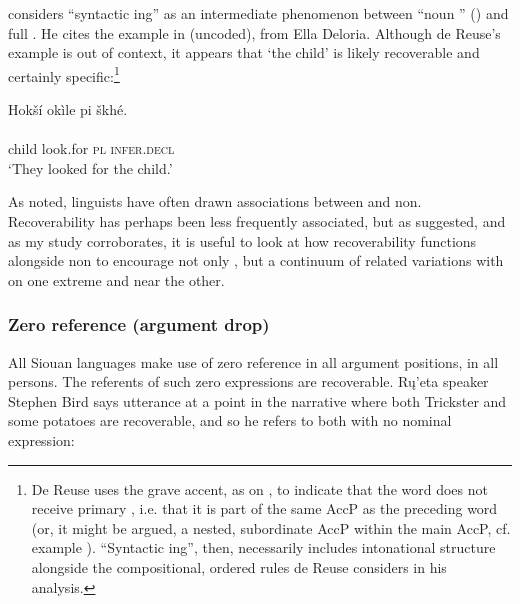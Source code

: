 \documentclass[output=paper]{LSP/langsci}
\begin{document}
 considers “syntactic ing” as an intermediate phenomenon between “noun ” () and full . He cites the example in  (uncoded), from Ella Deloria. Although de Reuse’s example is out of context, it appears that `the child' is likely recoverable and certainly specific:\footnote{De Reuse uses the grave accent, as on , to indicate that the word does not receive primary , i.e. that it is part of the same AccP as the preceding word (or, it might be argued, a nested, subordinate AccP within the main AccP, cf. example ). “Syntactic ing”, then, necessarily includes intonational structure alongside the compositional, ordered rules de Reuse considers in his analysis.}

\ea\label{deloriachild}
 	Hokší okìle pi škhé.\rmfnm\\
\gll	{}							\\
	child		look.for	\textsc{pl}		\textsc{infer.decl}\\
\glt	`They looked for the child.' 
\z

	As \citet{Graczyk1991a} noted, linguists have often drawn associations between  and non. Recoverability has perhaps been less frequently associated, but as \citet{deReuse1994} suggested, and as my study corroborates, it is useful to look at how recoverability functions alongside non to encourage not only , but a continuum of related variations with  on one extreme and  near the other.
	
\subsubsection{Zero reference (argument drop)}\label{zeroreference}

	All Siouan languages make use of zero reference in all argument positions, in all persons. The referents of such zero expressions are recoverable. Rų’eta speaker Stephen Bird says utterance  at a point in the narrative where both Trickster and some potatoes are recoverable, and so he refers to both with no nominal expression:
	
\end{document}
